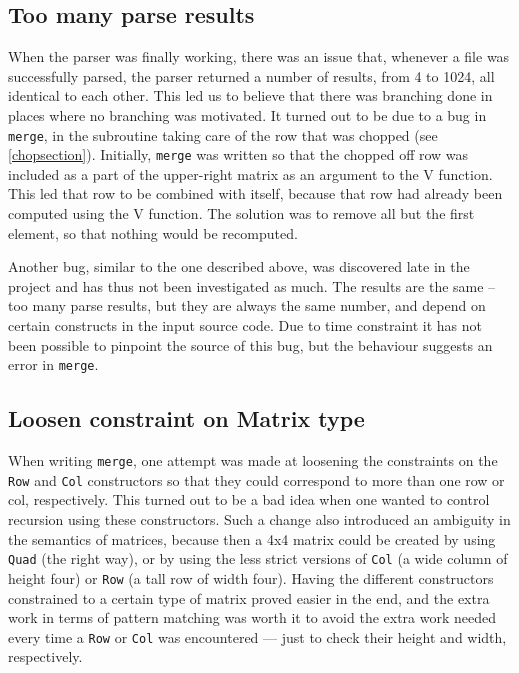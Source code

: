 \documentclass[a4paper,12pt,twosided]{report}
\begin{document}
\subsection{Too many parse results}
When the parser was finally working, there was an issue that, whenever a file
was successfully parsed, the parser returned a number of results, from 4 to
1024, all identical to each other. This led us to believe that there was
branching done in places where no branching was motivated. It turned out to be
due to a bug in \texttt{merge}, in the subroutine taking care of the row that
was chopped (see \ref{chopsection}). Initially, \texttt{merge} was written so
that the chopped off row was included as a part of the upper-right matrix as an
argument to the V function. This led that row to be combined with itself,
because that row had already been computed using the V function. The solution
was to remove all but the first element, so that nothing would be recomputed.

Another bug, similar to the one described above, was discovered late in the
project and has thus not been investigated as much. The results are the same --
too many parse results, but they are always the same number, and depend on
certain constructs in the input source code. Due to time constraint it has not
been possible to pinpoint the source of this bug, but the behaviour suggests an
error in \texttt{merge}. \label{branchbug}

\subsection{Loosen constraint on Matrix type}
When writing \texttt{merge}, one attempt was made at loosening the constraints
on the \texttt{Row} and \texttt{Col} constructors so that they could correspond
to more than one row or col, respectively. This turned out to be a bad idea when
one wanted to control recursion using these constructors. Such a change also
introduced an ambiguity in the semantics of matrices, because then a 4x4 matrix
could be created by using \texttt{Quad} (the right way), or by using the less
strict versions of \texttt{Col} (a wide column of height four) or \texttt{Row}
(a tall row of width four). Having the different constructors constrained to a
certain type of matrix proved easier in the end, and the extra work in terms of
pattern matching was worth it to avoid the extra work needed every time a
\texttt{Row} or \texttt{Col} was encountered --- just to check their height and
width, respectively.  
\end{document}
